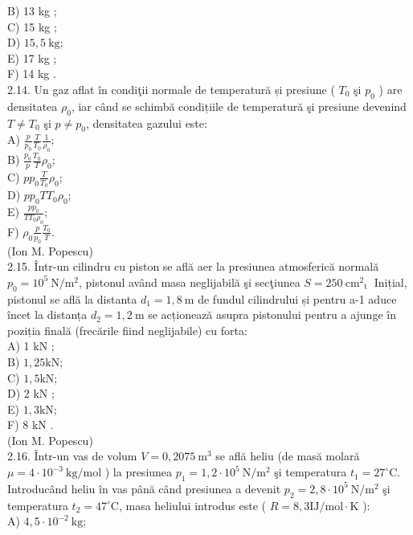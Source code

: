 B) 13 kg ;\\
C) 15 kg ;\\
D) $15,5 \mathrm{~kg}$;\\
E) 17 kg ;\\
F) 14 kg .\\
2.14. Un gaz aflat în condiţii normale de temperatură și presiune ( $T_{0}$ şi $p_{0}$ ) are densitatea $\rho_{0}$, iar când se schimbă condițiile de temperatură şi presiune devenind $T \neq T_{0}$ şi $p \neq p_{0}$, densitatea gazului este:\\
A) $\frac{p}{p_{0}} \frac{T}{T_{0}} \frac{1}{\rho_{0}}$;\\
B) $\frac{p_{0}}{p} \frac{T_{0}}{T} \rho_{0}$;\\
C) $p p_{0} \frac{T}{T_{0}} \rho_{0}$;\\
D) $p p_{0} T T_{0} \rho_{0}$;\\
E) $\frac{p p_{0}}{T T_{0} \rho_{0}}$;\\
F) $\rho_{0} \frac{p}{p_{0}} \frac{T_{0}}{T}$.\\
(Ion M. Popescu)\\
2.15. Într-un cilindru cu piston se află aer la presiunea atmosferică normală $p_{0}=10^{5} \mathrm{~N} / \mathrm{m}^{2}$, pistonul având masa neglijabilă şi secţiunea $S=250 \mathrm{~cm}^{2}{ }_{\text {t }}$ Inițial, pistonul se află la distanta $d_{1}=1,8 \mathrm{~m}$ de fundul cilindrului și pentru a-1 aduce încet la distanța $d_{2}=1,2 \mathrm{~m}$ se acționează asupra pistonului pentru a ajunge în poziția finală (frecările fiind neglijabile) cu forta:\\
A) 1 kN ;\\
B) $1,25 \mathrm{kN}$;\\
C) $1,5 \mathrm{kN}$;\\
D) 2 kN ;\\
E) $1,3 \mathrm{kN}$;\\
F) 8 kN .\\
(Ion M. Popescu)\\
2.16. Într-un vas de volum $V=0,2075 \mathrm{~m}^{3}$ se află heliu (de masă molară $\mu=4 \cdot 10^{-3} \mathrm{~kg} / \mathrm{mol}$ ) la presiunea $p_{1}=1,2 \cdot 10^{5} \mathrm{~N} / \mathrm{m}^{2}$ şi temperatura $t_{1}=27^{\circ} \mathrm{C}$. Introducând heliu în vas până când presiunea a devenit $p_{2}=2,8 \cdot 10^{5} \mathrm{~N} / \mathrm{m}^{2}$ şi temperatura $t_{2}=47^{\circ} \mathrm{C}$, masa heliului introdus este ( $R=8,3 \mathrm{IJ} / \mathrm{mol} \cdot \mathrm{K}$ ):\\
A) $4,5 \cdot 10^{-2} \mathrm{~kg}$;\\
